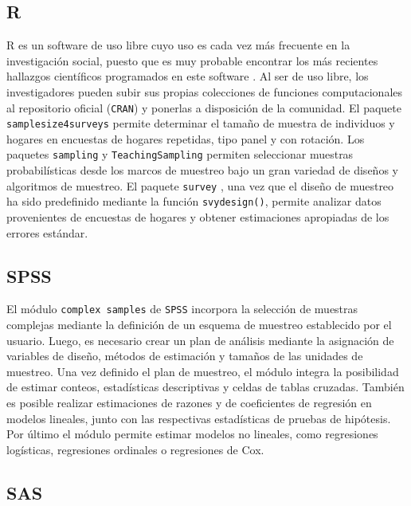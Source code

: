\hypertarget{r}{%
\subsection*{R}\label{r}}


R es un software de uso libre cuyo uso es cada vez más frecuente en la investigación social, puesto que es muy probable encontrar los más recientes hallazgos científicos programados en este software \citep{R_2017}. Al ser de uso libre, los investigadores pueden subir sus propias colecciones de funciones computacionales al repositorio oficial (\texttt{CRAN}) y ponerlas a disposición de la comunidad. El paquete \texttt{samplesize4surveys} \citep{ss4s} permite determinar el tamaño de muestra de individuos y hogares en encuestas de hogares repetidas, tipo panel y con rotación. Los paquetes \texttt{sampling} \citep{Yves} y \texttt{TeachingSampling} \citep{TS} permiten seleccionar muestras probabilísticas desde los marcos de muestreo bajo un gran variedad de diseños y algoritmos de muestreo. El paquete \texttt{survey} \citep{TL}, una vez que el diseño de muestreo ha sido predefinido mediante la función \texttt{svydesign()}, permite analizar datos provenientes de encuestas de hogares y obtener estimaciones apropiadas de los errores estándar.

\hypertarget{spss}{%
\subsection*{SPSS}\label{spss}}


El módulo \texttt{complex\ samples} de \texttt{SPSS} \citep{IBM_2017} incorpora la selección de muestras complejas mediante la definición de un esquema de muestreo establecido por el usuario. Luego, es necesario crear un plan de análisis mediante la asignación de variables de diseño, métodos de estimación y tamaños de las unidades de muestreo. Una vez definido el plan de muestreo, el módulo integra la posibilidad de estimar conteos, estadísticas descriptivas y celdas de tablas cruzadas. También es posible realizar estimaciones de razones y de coeficientes de regresión en modelos lineales, junto con las respectivas estadísticas de pruebas de hipótesis. Por último el módulo permite estimar modelos no lineales, como regresiones logísticas, regresiones ordinales o regresiones de Cox.

\hypertarget{sas}{%
\subsection*{SAS}\label{sas}}


